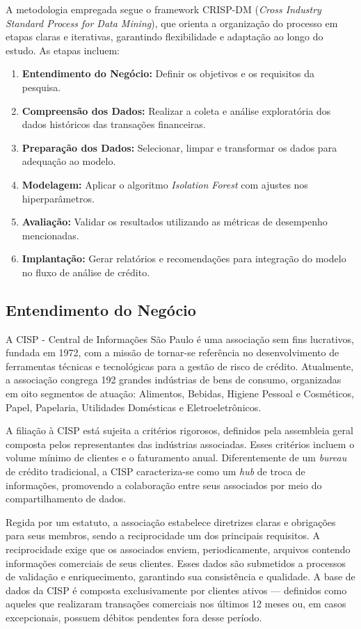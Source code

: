 \documentclass[12pt,a4paper]{article}
\begin{document}
A metodologia empregada segue o framework CRISP-DM (\textit{Cross Industry Standard Process for Data Mining}), que orienta a organização do processo em etapas claras e iterativas, garantindo flexibilidade e adaptação ao longo do estudo. As etapas incluem:
\begin{enumerate}
    \item \textbf{Entendimento do Negócio:} Definir os objetivos e os requisitos da pesquisa.
    \item \textbf{Compreensão dos Dados:} Realizar a coleta e análise exploratória dos dados históricos das transações financeiras.
    \item \textbf{Preparação dos Dados:} Selecionar, limpar e transformar os dados para adequação ao modelo.
    \item \textbf{Modelagem:} Aplicar o algoritmo \textit{Isolation Forest} com ajustes nos hiperparâmetros.
    \item \textbf{Avaliação:} Validar os resultados utilizando as métricas de desempenho mencionadas.
    \item \textbf{Implantação:} Gerar relatórios e recomendações para integração do modelo no fluxo de análise de crédito.
\end{enumerate}

\subsection{Entendimento do Negócio}

A CISP - Central de Informações São Paulo é uma associação sem fins lucrativos, fundada em 1972, com a missão de tornar-se referência no desenvolvimento de ferramentas técnicas e tecnológicas para a gestão de risco de crédito. Atualmente, a associação congrega 192 grandes indústrias de bens de consumo, organizadas em oito segmentos de atuação: Alimentos, Bebidas, Higiene Pessoal e Cosméticos, Papel, Papelaria, Utilidades Domésticas e Eletroeletrônicos.

A filiação à CISP está sujeita a critérios rigorosos, definidos pela assembleia geral composta pelos representantes das indústrias associadas. Esses critérios incluem o volume mínimo de clientes e o faturamento anual. Diferentemente de um \textit{bureau} de crédito tradicional, a CISP caracteriza-se como um \textit{hub} de troca de informações, promovendo a colaboração entre seus associados por meio do compartilhamento de dados.

Regida por um estatuto, a associação estabelece diretrizes claras e obrigações para seus membros, sendo a reciprocidade um dos principais requisitos. A reciprocidade exige que os associados enviem, periodicamente, arquivos contendo informações comerciais de seus clientes. Esses dados são submetidos a processos de validação e enriquecimento, garantindo sua consistência e qualidade. A base de dados da CISP é composta exclusivamente por clientes ativos — definidos como aqueles que realizaram transações comerciais nos últimos 12 meses ou, em casos excepcionais, possuem débitos pendentes fora desse período.
\end{document}
